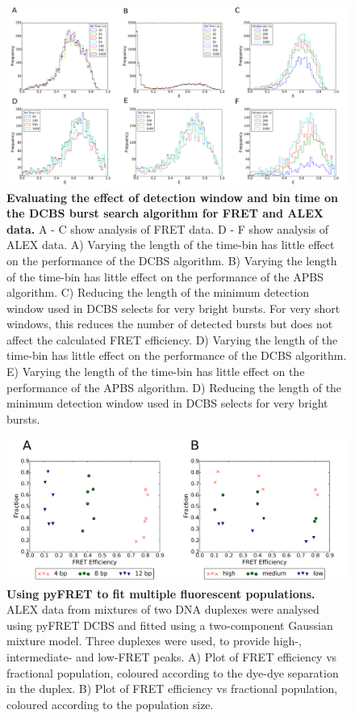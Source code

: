 \documentclass[10pt]{article}
\begin{document}
\begin{figure}[!ht]
   \begin{center}
      \includegraphics*[clip=true, width=6in]{window_effect.pdf}
      \caption{{\bf Evaluating the effect of detection window and bin time on the DCBS burst search algorithm for FRET and ALEX data.} A - C show analysis of FRET data. D - F show analysis of ALEX data. A) Varying the length of the time-bin has little effect on the performance of the DCBS algorithm. B) Varying the length of the time-bin has little effect on the performance of the APBS algorithm. C) Reducing the length of the minimum detection window used in DCBS selects for very bright bursts. For very short windows, this reduces the number of detected bursts but does not affect the calculated FRET efficiency. D) Varying the length of the time-bin has little effect on the performance of the DCBS algorithm. E) Varying the length of the time-bin has little effect on the performance of the APBS algorithm. D) Reducing the length of the minimum detection window used in DCBS selects for very bright bursts.}
      \label{fig:fig7_binning}
   \end{center}
\end{figure}

\begin{figure}[!ht]
   \begin{center}
      \includegraphics*[clip=true, width=6in]{ratios.pdf}
      \caption{{\bf Using pyFRET to fit multiple fluorescent populations.} ALEX data from mixtures of two DNA duplexes were analysed using pyFRET DCBS and fitted using a two-component Gaussian mixture model. Three duplexes were used, to provide high-, intermediate- and low-FRET peaks. A) Plot of FRET efficiency vs fractional population, coloured according to the dye-dye separation in the duplex. B) Plot of FRET efficiency vs fractional population, coloured according to the population size.}
      \label{fig:ratios}
   \end{center}
\end{figure}
\end{document}
